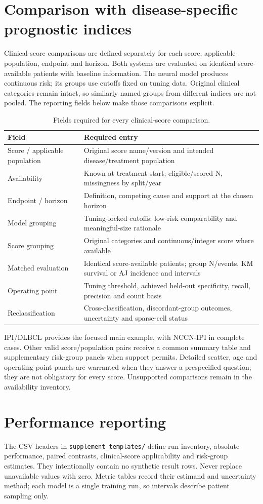 \documentclass[11pt]{article}
\begin{document}
\section{Comparison with disease-specific prognostic indices}
Clinical-score comparisons are defined separately for each score, applicable
population, endpoint and horizon. Both systems are evaluated on identical
score-available patients with baseline information. The neural model produces
continuous risk; its groups use cutoffs fixed on tuning data. Original clinical
categories remain intact, so similarly named groups from different indices
are not pooled. The reporting fields below make those comparisons explicit.
\begin{longtable}{L{4cm}L{10.2cm}}
\caption{Fields required for every clinical-score comparison.}\\
\toprule Field & Required entry\\\midrule\endhead
Score / applicable population & Original score name/version and intended disease/treatment population\\
Availability & Known at treatment start; eligible/scored N, missingness by split/year\\
Endpoint / horizon & Definition, competing cause and support at the chosen horizon\\
Model grouping & Tuning-locked cutoffs; low-risk comparability and meaningful-size rationale\\
Score grouping & Original categories and continuous/integer score where available\\
Matched evaluation & Identical score-available patients; group N/events, KM survival or AJ incidence and intervals\\
Operating point & Tuning threshold, achieved held-out specificity, recall, precision and count basis\\
Reclassification & Cross-classification, discordant-group outcomes, uncertainty and sparse-cell status\\\bottomrule
\end{longtable}
IPI/DLBCL provides the focused main example, with NCCN-IPI in complete cases. Other valid score/population
pairs receive a common summary table and supplementary risk-group panels when
support permits. Detailed scatter, age and operating-point panels are warranted
when they answer a prespecified question; they are not obligatory for every
score. Unsupported comparisons remain in the availability inventory.

\section{Performance reporting}
The CSV headers in \texttt{supplement\_templates/} define run inventory,
absolute performance, paired contrasts, clinical-score applicability and
risk-group estimates. They intentionally contain no synthetic result rows.
Never replace unavailable values with zero. Metric tables record their estimand
and uncertainty method; each model is a single training run, so intervals
describe patient sampling only.
\end{document}
